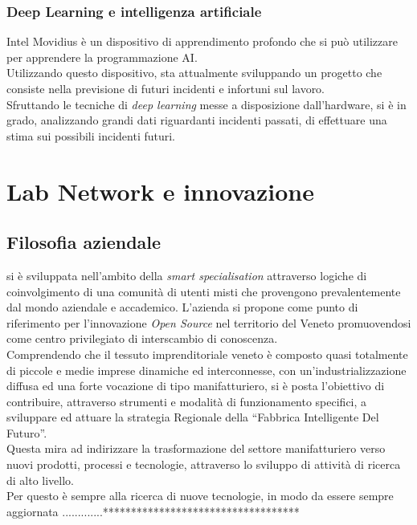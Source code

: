 \subsubsection{Deep Learning e intelligenza artificiale}
Intel Movidius è un dispositivo di apprendimento profondo che si può utilizzare per apprendere la programmazione AI.\\
Utilizzando questo dispositivo, \lab{} sta attualmente sviluppando un progetto che consiste nella previsione di futuri incidenti e infortuni sul lavoro.\\
Sfruttando le tecniche di \textit{deep learning} messe a disposizione dall'hardware, si è in grado, analizzando grandi dati riguardanti incidenti passati, di effettuare una stima sui possibili incidenti futuri.

\section{Lab Network e innovazione}
\subsection{Filosofia aziendale}
\lab{} si è sviluppata nell'ambito della \textit{smart specialisation} attraverso logiche di coinvolgimento di una comunità di utenti misti che provengono prevalentemente dal mondo aziendale e accademico. 
L'azienda si propone come punto di riferimento per l'innovazione \textit{Open Source} nel territorio del Veneto promuovendosi come centro privilegiato di interscambio di conoscenza.\\
Comprendendo che il tessuto imprenditoriale veneto è composto quasi totalmente di piccole e medie imprese dinamiche ed interconnesse, con un'industrializzazione diffusa ed una forte vocazione di tipo manifatturiero, \lab{} si è posta l'obiettivo di contribuire, attraverso strumenti e modalità di funzionamento specifici, a sviluppare ed attuare la strategia Regionale della ``Fabbrica Intelligente Del Futuro''.\\
Questa mira ad indirizzare la trasformazione del settore manifatturiero verso nuovi prodotti, processi e tecnologie, attraverso lo sviluppo di attività di ricerca di alto livello.\\
Per questo \lab{} è sempre alla ricerca di nuove tecnologie, in modo da essere sempre aggiornata .............***********************************


